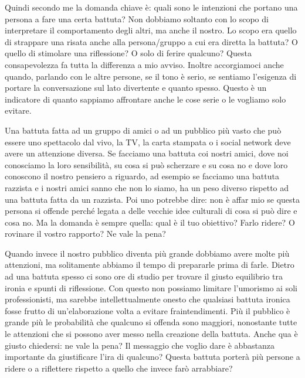 \documentclass[12pt]{book} %
\begin{document}
\begin{mdframed}[linewidth=1pt]
Quindi secondo me la domanda chiave è: quali sono le intenzioni che portano una persona a fare una certa battuta? Non
dobbiamo soltanto con lo scopo di interpretare il comportamento degli altri, ma anche il nostro. Lo scopo era quello di
strappare una risata anche alla persona/gruppo a cui era diretta la battuta? O quello di stimolare una riflessione? O
solo di ferire qualcuno? Questa consapevolezza fa tutta la differenza a mio avviso. Inoltre accorgiamoci anche quando,
parlando con le altre persone, se il tono è serio, se sentiamo l'esigenza di portare la
conversazione sul lato divertente e quanto spesso. Questo è un indicatore di quanto sappiamo affrontare anche le cose
serie o le vogliamo solo evitare.

Una battuta fatta ad un gruppo di amici o ad un pubblico più vasto che può essere uno spettacolo dal vivo, la TV, la
carta stampata o i social network deve avere un attenzione diversa. Se facciamo una battuta coi nostri amici, dove noi
conosciamo la loro sensibilità, su cosa si può scherzare e su cosa no e dove loro conoscono il nostro pensiero a
riguardo, ad esempio se facciamo una battuta razzista e i nostri amici sanno che non lo siamo, ha un peso diverso
rispetto ad una battuta fatta da un razzista. Poi uno potrebbe dire: non è affar mio se questa persona si
offende perché legata a delle vecchie idee culturali di cosa si può dire e cosa no. Ma la domanda è sempre quella: qual
è il tuo obiettivo? Farlo ridere? O rovinare il vostro rapporto? Ne vale la pena?

Quando invece il nostro pubblico diventa più grande dobbiamo avere molte più attenzioni, ma solitamente abbiamo il tempo
di prepararle prima di farle. Dietro ad una battuta spesso ci sono ore di studio per trovare il giusto equilibrio tra
ironia e spunti di riflessione. Con questo non possiamo limitare l'umorismo ai soli
professionisti, ma sarebbe intellettualmente onesto che qualsiasi battuta ironica fosse frutto di
un'elaborazione volta a evitare fraintendimenti. Più il pubblico è grande più le probabilità che
qualcuno si offenda sono maggiori, nonostante tutte le attenzioni che si possono aver messo nella creazione della
battuta. Anche qua è giusto chiedersi: ne vale la pena? Il messaggio che voglio dare è abbastanza importante da
giustificare l'ira di qualcuno? Questa battuta porterà più persone a ridere o a riflettere
rispetto a quello che invece farò arrabbiare?


\end{mdframed}
\end{document}
